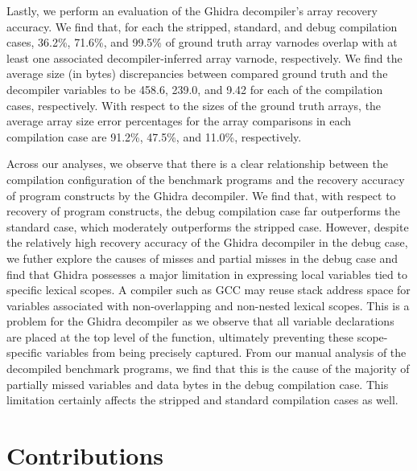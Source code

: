 Lastly, we perform an evaluation of the Ghidra decompiler's array recovery accuracy. We find that, for each the stripped, standard, and debug compilation cases, 36.2\%, 71.6\%, and 99.5\% of ground truth array varnodes overlap with at least one associated decompiler-inferred array varnode, respectively. We find the average size (in bytes) discrepancies between compared ground truth and the decompiler variables to be 458.6, 239.0, and 9.42 for each of the compilation cases, respectively. With respect to the sizes of the ground truth arrays, the average array size error percentages for the array comparisons in each compilation case are 91.2\%, 47.5\%, and 11.0\%, respectively.

Across our analyses, we observe that there is a clear relationship between the compilation configuration of the benchmark programs and the recovery accuracy of program constructs by the Ghidra decompiler. We find that, with respect to recovery of program constructs, the debug compilation case far outperforms the standard case, which moderately outperforms the stripped case. However, despite the relatively high recovery accuracy of the Ghidra decompiler in the debug case, we futher explore the causes of misses and partial misses in the debug case and find that Ghidra possesses a major limitation in expressing local variables tied to specific lexical scopes. A compiler such as GCC may reuse stack address space for variables associated with non-overlapping and non-nested lexical scopes. This is a problem for the Ghidra decompiler as we observe that all variable declarations are placed at the top level of the function, ultimately preventing these scope-specific variables from being precisely captured. From our manual analysis of the decompiled benchmark programs, we find that this is the cause of the majority of partially missed variables and data bytes in the debug compilation case. This limitation certainly affects the stripped and standard compilation cases as well.

\section{Contributions}

